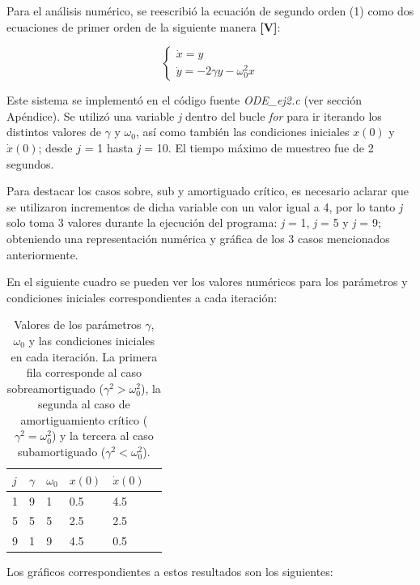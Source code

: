 \documentclass[a4paper,12pt]{article}
\begin{document}
Para el an\'alisis num\'erico, se reescribi\'o la ecuaci\'on de segundo orden (1) como dos ecuaciones de primer orden de la siguiente manera \textbf{[V]}:

$$ \begin{cases} \dot{x} = y \\ \dot{y} = -2\gamma y - \omega_0^2 x \end{cases} $$

Este sistema se implement\'o en el c\'odigo fuente \textit{ODE\_ej2.c} (ver secci\'on Ap\'endice). Se utiliz\'o una variable \textit{j} dentro del bucle \textit{for} para ir iterando los distintos valores de $\gamma$ y $\omega_0$, as\'i como tambi\'en las condiciones iniciales $x(0)$ y $\dot{x}(0)$; desde $j$ = 1 hasta \textit{j} = 10. El tiempo m\'aximo de muestreo fue de 2 segundos.

Para destacar los casos sobre, sub y amortiguado cr\'itico, es necesario aclarar que se utilizaron incrementos de dicha variable con un valor igual a 4, por lo tanto \textit{j} solo toma 3 valores durante la ejecuci\'on del programa: \textit{j} = 1, \textit{j} = 5 y \textit{j} = 9; obteniendo una representaci\'on num\'erica y gr\'afica de los 3 casos mencionados anteriormente.

En el siguiente cuadro se pueden ver los valores num\'ericos para los par\'ametros y condiciones iniciales correspondientes a cada iteraci\'on:

\begin{table}
	\centering
    \begin{tabular}{ | l | l | l | l | l |p{5cm} |}
    \hline
    $j$ & $\gamma$ & $\omega_0$ & $x(0)$ &  $\dot{x}(0)$ \\ \hline
    1 & 9 & 1 & 0.5 & 4.5 \\ \hline
    5 & 5 & 5 & 2.5 & 2.5 \\ \hline
    9 & 1 & 9 & 4.5 & 0.5 \\
    \hline
    \end{tabular}
    \caption{Valores de los par\'ametros $\gamma$, $\omega_0$ y las condiciones iniciales en cada iteraci\'on. La primera fila corresponde al caso sobreamortiguado ($\gamma^2 > \omega_0^2$), la segunda al caso de amortiguamiento cr\'itico ($\gamma^2 = \omega_0^2$) y la tercera al caso subamortiguado ($\gamma^2 < \omega_0^2$).}
    \label{table:1}
\end{table}
\newpage


Los gr\'aficos correspondientes a estos resultados son los siguientes:
\end{document}
